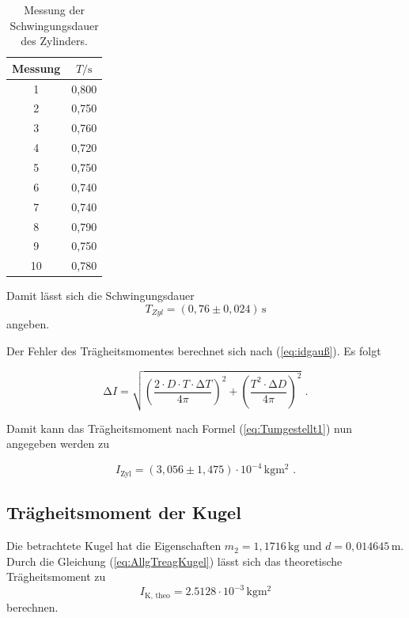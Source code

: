 \begin{table}
  \centering
  \caption{Messung der Schwingungsdauer des Zylinders.}
  \label{tab:SchwingungsdauerZylinder}
  \begin{tabular}{c c}
    \toprule
     Messung &  $T / \unit\second$ \\
    \midrule
              1 &        0,800 \\
              2 &        0,750 \\
              3 &        0,760 \\
              4 &        0,720 \\
              5 &        0,750 \\
              6 &        0,740 \\
              7 &        0,740 \\
              8 &        0,790 \\
              9 &        0,750 \\
             10 &        0,780 \\
    \bottomrule
  \end{tabular}
\end{table}

Damit lässt sich die Schwingungsdauer
\begin{equation*}
  T_{Zyl} = (0,76 \pm 0,024) \, \unit{\second}
\end{equation*}
angeben.

Der Fehler des Trägheitsmomentes berechnet sich nach (\ref{eq:idgauß}). Es folgt

\begin{equation*}
  \increment I = \sqrt{\left( \frac{2 \cdot D \cdot  T \cdot \increment T}{4 \pi} \right)^2 + \left( \frac{T^2 \cdot \increment D}{4 \pi}\right)^2}
  \text{ .}
\end{equation*}


Damit kann das Trägheitsmoment nach Formel (\ref{eq:Tumgestellt1}) nun angegeben werden zu

\begin{equation*}
  I_{\text{Zyl}} = (3,056 \pm 1,475) \cdot 10^{-4} \, \unit{\kilo\gram\meter\squared} \text{ .}
\end{equation*}

\subsection{Trägheitsmoment der Kugel}\label{sec:TreagKugel}

Die betrachtete Kugel hat die Eigenschaften $m_2 = 1,1716 \, \unit{\kilo\gram}$ und $d = 0,014645 \, \unit{\meter}$.
Durch die Gleichung (\ref{eq:AllgTreagKugel}) lässt sich das theoretische Trägheitsmoment zu 
\begin{equation*}
  I_{\text{K, theo}} = 2.5128 \cdot 10^{-3} \, \unit{\kilo\gram\meter\squared}
\end{equation*}
berechnen.

